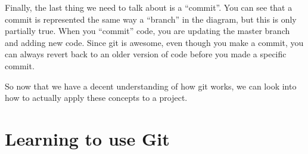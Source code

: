 \documentclass[11pt,fleqn]{article}
\theoremstyle{definition}
\begin{document}
Finally, the last thing we need to talk about is a ``commit''. You can see that a commit is
represented the same way a ``branch'' in the diagram, but this is only partially true. When you
``commit'' code, you are updating the master branch and adding new code. Since git is awesome, even
though you make a commit, you can always revert back to an older version of code before you made a
specific commit. 

So now that we have a decent understanding of how git works, we can look into how to actually apply
these concepts to a project. 

\section{Learning to use Git}
   

   
\end{document}
